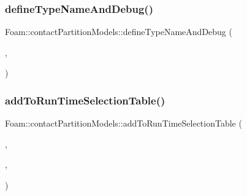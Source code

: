 \subsubsection{\texorpdfstring{define\+Type\+Name\+And\+Debug()}{defineTypeNameAndDebug()}\hspace{0.1cm}{\footnotesize\ttfamily [2/2]}}
{\footnotesize\ttfamily Foam\+::contact\+Partition\+Models\+::define\+Type\+Name\+And\+Debug (\begin{DoxyParamCaption}\item[{\hyperlink{classFoam_1_1contactPartitionModels_1_1linear}{linear}}]{,  }\item[{0}]{ }\end{DoxyParamCaption})}

\mbox{\label{namespaceFoam_1_1contactPartitionModels_a694ddba0cb6adcccd63b6c1f0ec1f8e2}} 
\subsubsection{\texorpdfstring{add\+To\+Run\+Time\+Selection\+Table()}{addToRunTimeSelectionTable()}\hspace{0.1cm}{\footnotesize\ttfamily [2/2]}}
{\footnotesize\ttfamily Foam\+::contact\+Partition\+Models\+::add\+To\+Run\+Time\+Selection\+Table (\begin{DoxyParamCaption}\item[{\hyperlink{classFoam_1_1contactPartitionModel}{contact\+Partition\+Model}}]{,  }\item[{\hyperlink{classFoam_1_1contactPartitionModels_1_1linear}{linear}}]{,  }\item[{contact\+Partition\+Models}]{ }\end{DoxyParamCaption})}

